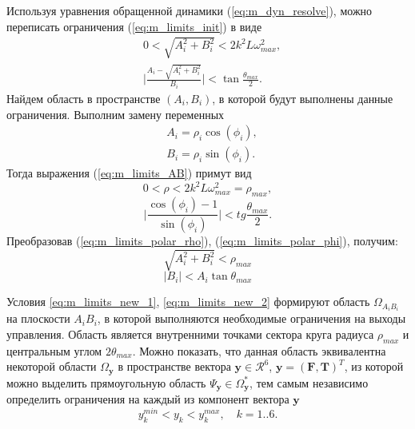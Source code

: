 Используя уравнения обращенной динамики (\ref{eq:m_dyn_resolve}), можно переписать ограничения (\ref{eq:m_limits_init}) в виде
\begin{equation} \label{eq:m_limits_AB}
\begin{aligned}
&0 <
\sqrt{A^2_i +  B^2_i}
< 2 k^2 L\omega_{max}^2,
\\
&\Bigg|\frac{A_i-\sqrt{A^2_i +  B^2_i}}{B_i}\Bigg| < 
\tan\frac{\theta_{max}}{2}.
\end{aligned}
\end{equation}
Найдем область в пространстве $(A_i, B_i)$, в которой будут выполнены данные ограничения. Выполним замену переменных
\begin{equation} \label{eq:m_polar}
\begin{aligned}
&A_i = \rho_i \cos(\phi_i),
\\
&B_i = \rho_i \sin(\phi_i).
\end{aligned}
\end{equation}
Тогда выражения (\ref{eq:m_limits_AB}) примут вид
\begin{equation} \label{eq:m_limits_polar_rho}
0 < \rho < 
2 k^2 L\omega_{max}^2
= \rho_{max},
\end{equation}
\begin{equation} \label{eq:m_limits_polar_phi}
\Bigg| \frac{\cos(\phi_i)-1}{\sin(\phi_i)} \Bigg| < 
tg\frac{\theta_{max}}{2}.
\end{equation}
Преобразовав
(\ref{eq:m_limits_polar_rho}),
(\ref{eq:m_limits_polar_phi}),
получим:
\begin{equation} \label{eq:m_limits_new_1}
\sqrt{A^2_i +  B^2_i} <
\rho_{max}
\end{equation}
\begin{equation} \label{eq:m_limits_new_2}
|B_i| < A_i \tan \theta_{max}
\end{equation}

Условия \eqref{eq:m_limits_new_1}, \eqref{eq:m_limits_new_2} формируют область $\Omega_{A_iB_i}$ на плоскости $A_iB_i$, в которой выполняются необходимые ограничения на выходы управления. Область является внутренними точками сектора круга радиуса $\rho_{max}$ и центральным углом $2\theta_{max}.$ Можно показать, что данная область эквивалентна некоторой области $\Omega_{\bm{y}}$ в пространстве вектора  $\bm{y} \in \mathcal{R}^6$, $\bm{y} = (\bm{F}, \bm{T})^T$, из которой можно выделить прямоугольную область $\Psi_{\bm y} \in \Omega^*_{\bm y}$, тем самым независимо определить ограничения на каждый из компонент вектора $\bm y$
\begin{equation} \label{rect_in}
y_k^{min} < y_k < y_k^{max},
\quad k = 1 .. 6.
\end{equation}

